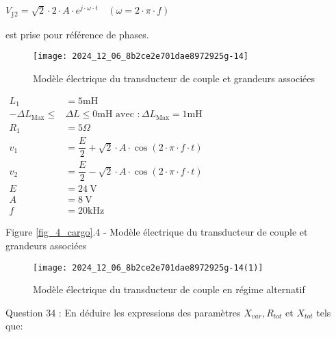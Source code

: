 $
\underline{V_{12}}=\sqrt{2} \cdot 2 \cdot A \cdot e^{j \cdot \omega \cdot t} \quad(\omega=2 \cdot \pi \cdot f)
$

est prise pour référence de phases.\\

\begin{figure}[!htb]
\begin{center}
\texttt{[image: 2024\_12\_06\_8b2ce2e701dae8972925g-14]}
\caption{ Modèle électrique du transducteur de couple et grandeurs associées \label{fig_44}}
\end{center}
\end{figure}

$
\begin{aligned}
L_{1} & =5 \mathrm{mH} \\
-\Delta L_{\text{Max}} \leq & \Delta L \leq 0 \mathrm{mH} \text { avec }: \Delta L_{\text{Max}}=1 \mathrm{mH} \\
R_{1} & =5 \Omega \\
v_{1} & =\dfrac{E}{2}+\sqrt{2} \cdot A \cdot \cos (2 \cdot \pi \cdot f \cdot t) \\
v_{2} & =\dfrac{E}{2}-\sqrt{2} \cdot A \cdot \cos (2 \cdot \pi \cdot f \cdot t) \\
E & =24 \mathrm{~V} \\
A & =8 \mathrm{~V} \\
f & =20 \mathrm{kHz}
\end{aligned}
$

Figure \ref{fig_4_cargo}.4 - Modèle électrique du transducteur de couple et grandeurs associées\\

\begin{figure}[!htb]
\begin{center}
\texttt{[image: 2024\_12\_06\_8b2ce2e701dae8972925g-14(1)]}
\caption{Modèle électrique du transducteur de couple en régime alternatif \label{fig10}}
\end{center}
\end{figure}


\ifprof
\begin{corrige}

\end{corrige}

\else
Question 34 : En déduire les expressions des paramètres \(X_{v a r}, R_{t o t}\) et \(X_{t o t}\) tels que:

